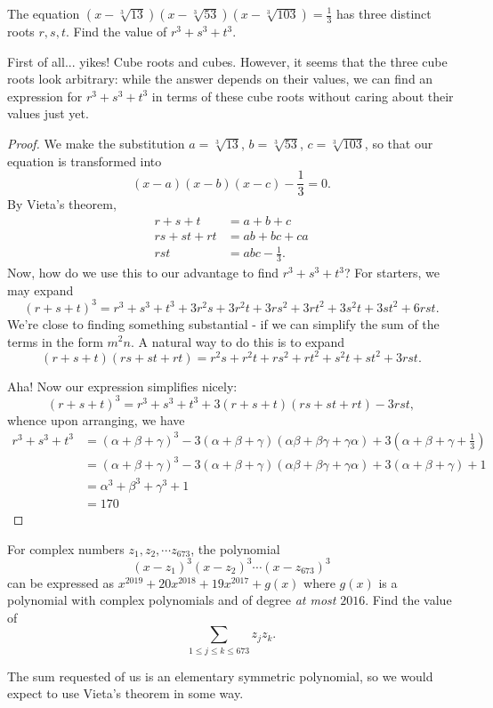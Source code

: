 \documentclass[../jarvis.tex]{subfiles}
\begin{document}
\begin{example}
    The equation $(x-\sqrt[3]{13})(x-\sqrt[3]{53})(x-\sqrt[3]{103})=\frac{1}{3}$ has three distinct roots $r,s,t$. Find the value of $r^3+s^3+t^3$.
\end{example}

First of all... yikes! Cube roots and cubes. However, it seems that the three cube roots look arbitrary: while the answer depends on their values, we can find an expression for $r^3+s^3+t^3$ in terms of these cube roots without caring about their values just yet. 
\begin{proof}
    We make the substitution $a=\sqrt[3]{13}$, $b=\sqrt[3]{53}$, $c=\sqrt[3]{103}$, so that our equation is transformed into $$(x-a)(x-b)(x-c)-\frac{1}{3}=0.$$ By Vieta's theorem, 
\begin{align*}
    r+s+t&=a+b+c \\
    rs+st+rt&=ab+bc+ca \\
    rst&=abc-\frac{1}{3}.
\end{align*}
Now, how do we use this to our advantage to find $r^3+s^3+t^3$? For starters, we may expand
$$(r+s+t)^3=r^3+s^3+t^3+3r^2s+3r^2t+3rs^2+3rt^2+3s^2t+3st^2+6rst.$$
We're close to finding something substantial - if we can simplify the sum of the terms in the form $m^2n$. A natural way to do this is to expand
$$(r+s+t)(rs+st+rt)=r^2s+r^2t+rs^2+rt^2+s^2t+st^2+3rst.$$

Aha! Now our expression simplifies nicely:
$$(r+s+t)^3=r^3+s^3+t^3+3(r+s+t)(rs+st+rt)-3rst,$$
whence upon arranging, we have
\begin{align*}
    r^3+s^3+t^3
    &=(\alpha+\beta+\gamma)^3-3(\alpha+\beta+\gamma)(\alpha\beta+\beta\gamma+\gamma\alpha)+3\left(\alpha+\beta+\gamma+\frac{1}{3}\right)\\
    &=(\alpha+\beta+\gamma)^3-3(\alpha+\beta+\gamma)(\alpha\beta+\beta\gamma+\gamma\alpha)+3(\alpha+\beta+\gamma)+1 \\
    &=\alpha^3+\beta^3+\gamma^3+1 \\
    &=\boxed{170}
\end{align*}
\end{proof}

\begin{example}[2019 AIME I P10]
For complex numbers $z_1, z_2,\cdots z_{673}$, the polynomial
$$(x-z_1)^3(x-z_2)^3\cdots(x-z_{673})^3$$
can be expressed as $x^{2019}+20x^{2018}+19x^{2017}+g(x)$ where $g(x)$ is a polynomial with complex polynomials and of degree \textit{at most} $2016$. Find the value of 
$$\sum_{1\leq j\leq k\leq 673}z_jz_k.$$
\end{example}
The sum requested of us is an elementary symmetric polynomial, so we would expect to use Vieta's theorem in some way.
\end{document}
